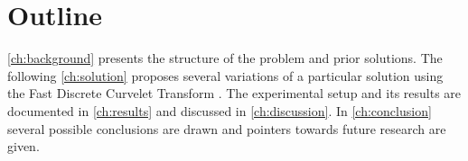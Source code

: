 \section{Outline}

\autoref{ch:background} presents the structure of the problem and prior
solutions. The following \autoref{ch:solution} proposes several variations of a
particular solution using the Fast Discrete Curvelet Transform
\autocite{candes_fast_2006}. The experimental setup and its results are
documented in \autoref{ch:results} and discussed in \autoref{ch:discussion}. In
\autoref{ch:conclusion} several possible conclusions are drawn and pointers
towards future research are given.

